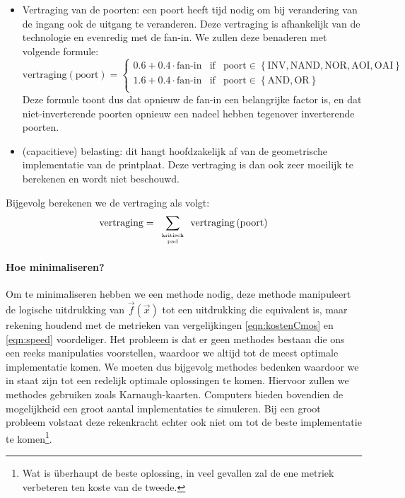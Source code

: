 \begin{itemize}
\begin{itemize}
\item Vertraging van de poorten: een poort heeft tijd nodig om bij verandering van de ingang ook de uitgang te veranderen. Deze vertraging is afhankelijk van de technologie en evenredig met de fan-in. We zullen deze benaderen met volgende formule:
\begin{equation}
\mbox{vertraging}\left(\mbox{poort}\right)=\left\{\begin{array}{lcl}
0.6+0.4\cdot\mbox{fan-in}&\mbox{if}&\mbox{poort}\in\left\{\mbox{INV},\mbox{NAND},\mbox{NOR},\mbox{AOI},\mbox{OAI}\right\}\\
1.6+0.4\cdot\mbox{fan-in}&\mbox{if}&\mbox{poort}\in\left\{\mbox{AND},\mbox{OR}\right\}\\
\end{array}\right.
\label{eqn:speedPoort}
\end{equation}
Deze formule toont dus dat opnieuw de fan-in een belangrijke factor is, en dat niet-inverterende poorten opnieuw een nadeel hebben tegenover inverterende poorten.
\item (capacitieve) belasting: dit hangt hoofdzakelijk af van de geometrische implementatie van de printplaat. Deze vertraging is dan ook zeer moeilijk te berekenen en wordt niet beschouwd.
\end{itemize}
Bijgevolg berekenen we de vertraging als volgt:
\begin{equation}
\mbox{vertraging}=\displaystyle\sum_{\tiny\begin{array}{c}\mbox{kritisch}\\\mbox{pad}\end{array}}{\mbox{vertraging}\left(\mbox{poort}\right)}
\label{eqn:speed}
\end{equation}
\end{itemize}
\paragraph{Hoe minimaliseren?}Om te minimaliseren hebben we een methode nodig, deze methode manipuleert de logische uitdrukking van $\vec{f}(\vec{x})$ tot een uitdrukking die equivalent is, maar rekening houdend met de metrieken van vergelijkingen \ref{eqn:kostenCmos} en \ref{eqn:speed} voordeliger. Het probleem is dat er geen methodes bestaan die ons een reeks manipulaties voorstellen, waardoor we altijd tot de meest optimale implementatie komen. We moeten dus bijgevolg methodes bedenken waardoor we in staat zijn tot een redelijk optimale oplossingen te komen. Hiervoor zullen we methodes gebruiken zoals Karnaugh-kaarten. Computers bieden bovendien de mogelijkheid een groot aantal implementaties te simuleren. Bij een groot probleem volstaat deze rekenkracht echter ook niet om tot de beste implementatie te komen\footnote{Wat is \"uberhaupt de beste oplossing, in veel gevallen zal de ene metriek verbeteren ten koste van de tweede.}.
